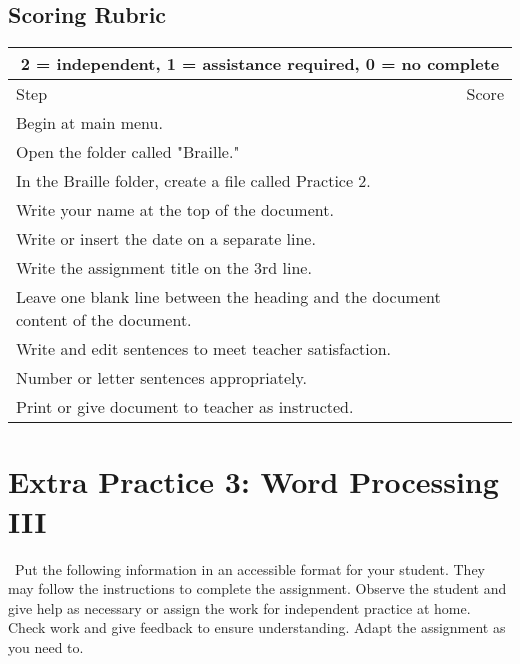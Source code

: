 \documentclass[10pt,letterpaper,twoside]{report}
\begin{document}
\subsection{Scoring Rubric}
{
\renewcommand{\arraystretch}{1.5}
\begin{table}[!htbp]
	\centering
	\begin{tabular}{|l|r|}
		\hline
		\multicolumn{2}{|c|}{2 = independent, 1 = assistance required, 0 = no complete} \\
		\hline
		Step                                                                               & Score \\[.5em]
		\hline
		Begin at main menu.                                                                &       \\ \hline
		Open the folder called "Braille."                                                  &       \\ \hline	
		In the Braille folder, create a file called Practice 2.                            &       \\ \hline	
		Write your name at the top of the document.                                        &       \\ \hline
		Write or insert the date on a separate line.                                       &       \\ \hline		
		Write the assignment title on the 3rd line.                                        &       \\ \hline	
		Leave one blank line between the heading and the document content of the document. &       \\ \hline
		Write and edit sentences to meet teacher satisfaction.                             &       \\ \hline		
		Number or letter sentences appropriately.                                          &       \\ \hline
		Print or give document to teacher as instructed.                                   &       \\ \hline
	\end{tabular}
	
\end{table}
\clearpage
\section{Extra Practice 3: Word Processing III}
\
Put the following information in an accessible format for your student. They may follow the instructions to complete the assignment. Observe the student and give help as necessary or assign the work for independent practice at home. Check work and give feedback to ensure understanding. Adapt the assignment as you need to.
}
\end{document}
